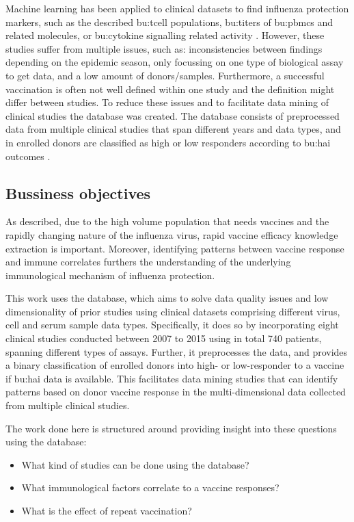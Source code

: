 Machine learning has been applied to clinical datasets to find influenza protection markers, such as the described \gls{bu:tcell} populations, \gls{bu:titer}s of \gls{bu:pbmc}s and related molecules, or \gls{bu:cytokine} signalling related activity \citep{furmanApoptosisOtherImmune2013, sobolevAdjuvantedInfluenzaH1N1Vaccination2016, tsangGlobalAnalysesHuman2014}.
However, these studies suffer from multiple issues, such as: inconsistencies between findings depending on the epidemic season, only focussing on one type of biological assay to get data, and a low amount of donors/samples.
Furthermore, a successful vaccination is  often not well defined within one study and the definition might differ between studies.
To reduce these issues and to facilitate data mining of clinical studies the \flup database was created.
The \flup database consists of preprocessed data from multiple clinical studies that span different years and data types, and in \flup enrolled donors are classified as high or low responders according to \gls{bu:hai} outcomes \citep{tomicFluPRINTDatasetMultidimensional2019}.

\subsection{Bussiness objectives}

As described, due to the high volume population that needs vaccines and the rapidly changing nature of the influenza virus, rapid vaccine efficacy knowledge extraction is important.
Moreover, identifying patterns between vaccine response and immune correlates furthers the understanding of the underlying immunological mechanism of influenza protection.

This work uses the \flup database, which aims to solve data quality issues and low dimensionality of prior studies using clinical datasets comprising different virus, cell and serum sample data types.
Specifically, it does so by incorporating eight clinical studies conducted between 2007 to 2015 using in total 740 patients, spanning different types of assays.
Further, it preprocesses the data, and provides a binary classification of enrolled donors into high- or low-responder to a vaccine if \gls{bu:hai} data is available.
This facilitates data mining studies that can identify patterns based on donor vaccine response in the multi-dimensional data collected from multiple clinical studies.

The work done here is structured around providing insight into these questions using the \flup database:
\begin{itemize}
        \item What kind of studies can be done using the \flup database?
        \item What immunological factors correlate to a vaccine responses?
        \item What is the effect of repeat vaccination?
\end{itemize}

